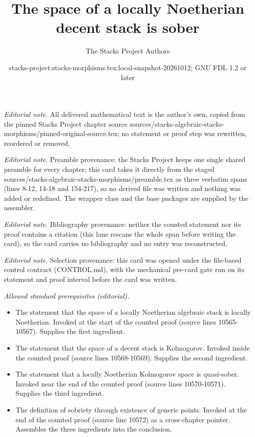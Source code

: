 \documentclass[10pt,a4paper]{amsart}
\title{The space of a locally Noetherian decent stack is sober}
\author{The Stacks Project Authors}
\date{stacks-project:stacks-morphisms.tex:local-snapshot-20261012; GNU FDL 1.2 or later}
\theoremstyle{plain}
\theoremstyle{definition}
\theoremstyle{remark}
\numberwithin{equation}{subsection}
\begin{document}
\maketitle
\noindent\textit{Editorial note.} All delivered mathematical text is the author's own, copied from the pinned Stacks Project chapter source sources/stacks-algebraic-stacks-morphisms/pinned-original-source.tex; no statement or proof step was rewritten, reordered or removed.\par\medskip
\noindent\textit{Editorial note.} Preamble provenance: the Stacks Project keeps one single shared preamble for every chapter; this card takes it directly from the staged sources/stacks-algebraic-stacks-morphisms/preamble.tex as three verbatim spans (lines 8-12, 14-18 and 154-217), so no derived file was written and nothing was added or redefined. The wrapper class and the base packages are supplied by the assembler.\par\medskip
\noindent\textit{Editorial note.} Bibliography provenance: neither the counted statement nor its proof contains a citation (this lane rescans the whole span before writing the card), so the card carries no bibliography and no entry was reconstructed.\par\medskip
\noindent\textit{Editorial note.} Selection provenance: this card was opened under the file-based control contract (CONTROL.md), with the mechanical pre-card gate run on its statement and proof interval before the card was written.\par\medskip
\noindent\textit{Allowed standard prerequisites (editorial).}\begin{itemize}
\item The statement that the space of a locally Noetherian algebraic stack is locally Noetherian. Invoked at the start of the counted proof (source lines 10565-10567). Supplies the first ingredient.
\item The statement that the space of a decent stack is Kolmogorov. Invoked inside the counted proof (source lines 10568-10569). Supplies the second ingredient.
\item The statement that a locally Noetherian Kolmogorov space is quasi-sober. Invoked near the end of the counted proof (source lines 10570-10571). Supplies the third ingredient.
\item The definition of sobriety through existence of generic points. Invoked at the end of the counted proof (source line 10572) as a cross-chapter pointer. Assembles the three ingredients into the conclusion.
\end{itemize}\medskip
\end{document}
